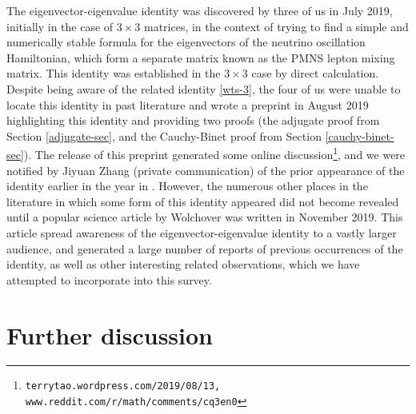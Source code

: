 \documentclass[12pt]{amsart}
\begin{document}
The eigenvector-eigenvalue identity was discovered by three of us \cite{Denton:2019ovn} in July 2019, initially in the case of $3 \times 3$ matrices, in the context of trying to find a simple and numerically stable formula for the eigenvectors of the neutrino oscillation Hamiltonian, which form a separate matrix known as the PMNS lepton mixing matrix.  	This identity was established in the $3 \times 3$ case by direct calculation.  Despite being aware of the related identity \eqref{wts-3}, the four of us were unable to locate this identity in past literature and wrote a preprint \cite{DPTZ} in August 2019 highlighting this identity and providing two proofs (the adjugate proof from Section \ref{adjugate-sec}, and the Cauchy-Binet proof from Section \ref{cauchy-binet-sec}).  The release of this preprint generated some online discussion\footnote{\tt terrytao.wordpress.com/2019/08/13, www.reddit.com/r/math/comments/cq3en0}, and we were notified by Jiyuan Zhang (private communication) of the prior appearance of the identity earlier in the year in \cite{2019arXiv190505314F}.  However, the numerous other places in the literature in which some form of this identity appeared did not become revealed until a popular science article \cite{wolchover-2019} by Wolchover was written in November 2019.  This article spread awareness of the eigenvector-eigenvalue identity to a vastly larger audience, and generated a large number of reports of previous occurrences of the identity, as well as other interesting related observations, which we have attempted to incorporate into this survey.  


\section{Further discussion}
\end{document}
